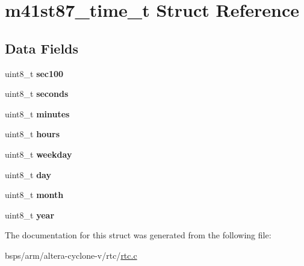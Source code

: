 \hypertarget{structm41st87__time__t}{}\section{m41st87\+\_\+time\+\_\+t Struct Reference}
\label{structm41st87__time__t}
\subsection*{Data Fields}
\begin{DoxyCompactItemize}
\item 
\mbox{\label{structm41st87__time__t_aae3b4ec0f8d6cd03ef7b64f7c120f94d}} 
uint8\+\_\+t {\bfseries sec100}
\item 
\mbox{\label{structm41st87__time__t_a554200c34e5e4a210279dbfefae1ec1a}} 
uint8\+\_\+t {\bfseries seconds}
\item 
\mbox{\label{structm41st87__time__t_a6c1a6a107131582e2c2330da149ff6aa}} 
uint8\+\_\+t {\bfseries minutes}
\item 
\mbox{\label{structm41st87__time__t_af1dbf181b1bebe5cb21a6d79c144d684}} 
uint8\+\_\+t {\bfseries hours}
\item 
\mbox{\label{structm41st87__time__t_a5e7846229dd1e665c3a5898e8c3b01fc}} 
uint8\+\_\+t {\bfseries weekday}
\item 
\mbox{\label{structm41st87__time__t_a27c430f169308147a6f0f0fc47bba460}} 
uint8\+\_\+t {\bfseries day}
\item 
\mbox{\label{structm41st87__time__t_adb2391bee153c3f8e4d1709647307efb}} 
uint8\+\_\+t {\bfseries month}
\item 
\mbox{\label{structm41st87__time__t_a44589dc5dca7fdae3533b10060b6050f}} 
uint8\+\_\+t {\bfseries year}
\end{DoxyCompactItemize}


The documentation for this struct was generated from the following file\+:\begin{DoxyCompactItemize}
\item 
bsps/arm/altera-\/cyclone-\/v/rtc/\mbox{\hyperlink{arm_2altera-cyclone-v_2rtc_2rtc_8c}{rtc.\+c}}\end{DoxyCompactItemize}
